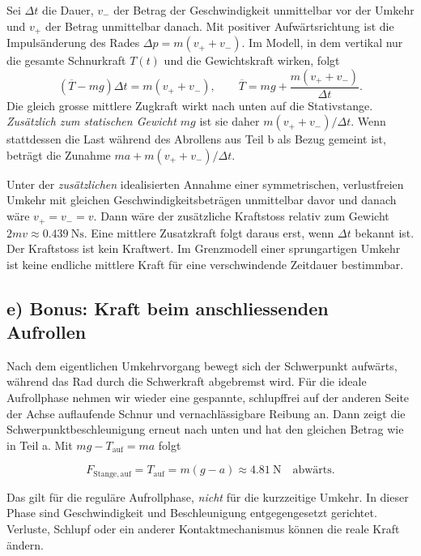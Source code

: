 Sei $\Delta t$ die Dauer, $v_-$ der Betrag der Geschwindigkeit unmittelbar
vor der Umkehr und $v_+$ der Betrag unmittelbar danach. Mit positiver
Aufwärtsrichtung ist die Impulsänderung des Rades
$\Delta p=m(v_+ + v_-)$. Im Modell, in dem vertikal nur die gesamte
Schnurkraft $T(t)$ und die Gewichtskraft wirken, folgt
\begin{equation}
  (\overline T-mg)\Delta t=m(v_+ + v_-),
  \qquad
  \overline T=mg+\frac{m(v_+ + v_-)}{\Delta t}.
\end{equation}
Die gleich grosse mittlere Zugkraft wirkt nach unten auf die Stativstange.
\emph{Zusätzlich zum statischen Gewicht $mg$} ist sie daher
$m(v_+ + v_-)/\Delta t$. Wenn stattdessen die Last während des Abrollens aus
Teil b als Bezug gemeint ist, beträgt die Zunahme
$ma+m(v_+ + v_-)/\Delta t$.

Unter der \emph{zusätzlichen} idealisierten Annahme einer symmetrischen,
verlustfreien Umkehr mit gleichen Geschwindigkeitsbeträgen unmittelbar davor
und danach wäre $v_+=v_-=v$. Dann wäre der zusätzliche Kraftstoss relativ zum
Gewicht $2mv\approx\qty{0.439}{\newton\second}$. Eine mittlere Zusatzkraft
folgt daraus erst, wenn $\Delta t$ bekannt ist. Der Kraftstoss ist kein
Kraftwert. Im Grenzmodell einer sprungartigen Umkehr ist keine endliche mittlere
Kraft für eine verschwindende Zeitdauer bestimmbar.

\subsection*{e) Bonus: Kraft beim anschliessenden Aufrollen}
Nach dem eigentlichen Umkehrvorgang bewegt sich der Schwerpunkt aufwärts,
während das Rad durch die Schwerkraft abgebremst wird. Für die ideale
Aufrollphase nehmen wir wieder eine gespannte, schlupffrei auf der anderen
Seite der Achse auflaufende Schnur und vernachlässigbare Reibung an. Dann
zeigt die Schwerpunktbeschleunigung erneut nach unten und hat den gleichen
Betrag wie in Teil a. Mit $mg-T_{\mathrm{auf}}=ma$ folgt
\begin{ergebnis}
\begin{equation*}
  F_{\mathrm{Stange,auf}}=T_{\mathrm{auf}}=m(g-a)
   \approx\qty{4.81}{\newton}\quad\text{abwärts}.
\end{equation*}
\end{ergebnis}
Das gilt für die reguläre Aufrollphase, \emph{nicht} für die kurzzeitige
Umkehr. In dieser Phase sind Geschwindigkeit und Beschleunigung
entgegengesetzt gerichtet. Verluste, Schlupf oder ein anderer Kontaktmechanismus
können die reale Kraft ändern.


